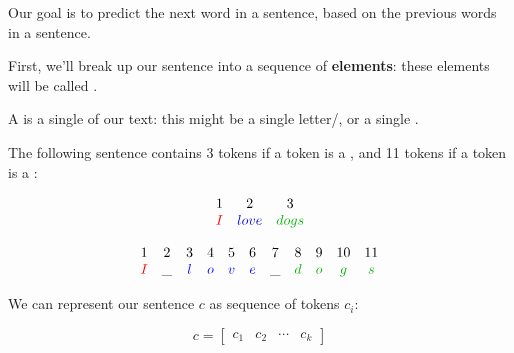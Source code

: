         Our goal is to  predict the next word in a sentence, based on the previous words in a sentence.

        First, we'll break up our sentence into a sequence of \textbf{elements}: these elements will be called .\\

        \begin{definition}
            A  is a single  of our text: this might be a single letter/, or a single .
        \end{definition}
        

        \miniex The following sentence contains 3 tokens if a token is a , and 11 tokens if a token is a :

        \begin{equation}
            \begin{matrix}
                1&2&3\\
                \red{I}&\blu{love}&\grn{dogs}
            \end{matrix}
        \end{equation}
        
        \begin{equation}
            \begin{array}{ccccccccccc}
                1 & 2 & 3 & 4 & 5 & 6 & 7 & 8 & 9 & 10 & 11 \\
                \red{I} & \_ & \blu{l} & \blu{o} & \blu{v} & \blu{e} & \_ & \grn{d} & \grn{o} & \grn{g} & \grn{s} \\
            \end{array}
        \end{equation}

        We can represent our sentence $c$ as sequence of tokens $c_i$:

        \begin{equation}
            c = \begin{bmatrix}
                c_1 & c_2 & \cdots & c_k
            \end{bmatrix}
        \end{equation}



    \phantom{}

